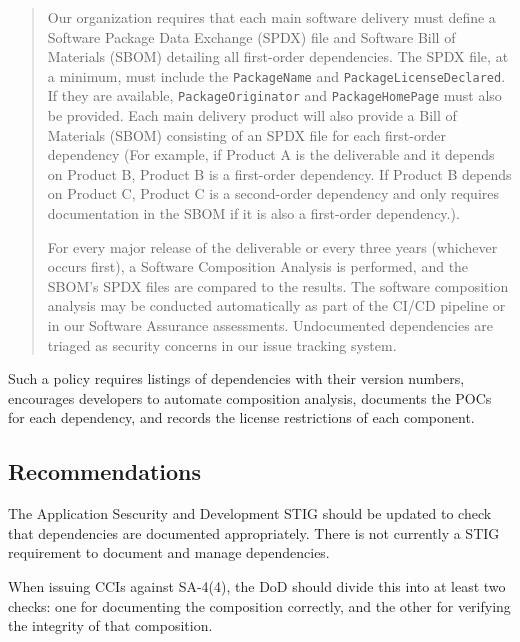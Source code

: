 \begin{quote}
Our organization requires that each main software delivery must define a Software Package Data Exchange (SPDX) file and Software Bill of Materials (SBOM) detailing all first-order dependencies.\autocite{20210628:wheeler2019} The SPDX file, at a minimum, must include the \texttt{PackageName} and \texttt{PackageLicenseDeclared}. If they are available, \texttt{PackageOriginator} and \texttt{PackageHomePage} must also be provided. Each main delivery product will also provide a Bill of Materials (SBOM) consisting of an SPDX file for each first-order dependency (For example, if Product A is the deliverable and it depends on Product B, Product B is a first-order dependency. If Product B depends on Product C, Product C is a second-order dependency and only requires documentation in the SBOM if it is also a first-order dependency.).

For every major release of the deliverable or every three years (whichever occurs first), a Software Composition Analysis is performed, and the SBOM's SPDX files are compared to the results. The software composition analysis may be conducted automatically as part of the CI/CD pipeline or in our Software Assurance assessments. Undocumented dependencies are triaged as security concerns in our issue tracking system.
\end{quote}

Such a policy requires listings of dependencies with their version numbers, encourages developers to automate composition analysis, documents the POCs for each dependency, and records the license restrictions of each component.

\subsection{Recommendations}

The Application Sescurity and Development STIG should be updated to check that dependencies are documented appropriately. There is not currently a STIG requirement to document and manage dependencies.

When issuing CCIs against SA-4(4), the DoD should divide this into at least two checks: one for documenting the composition correctly, and the other for verifying the integrity of that composition.
